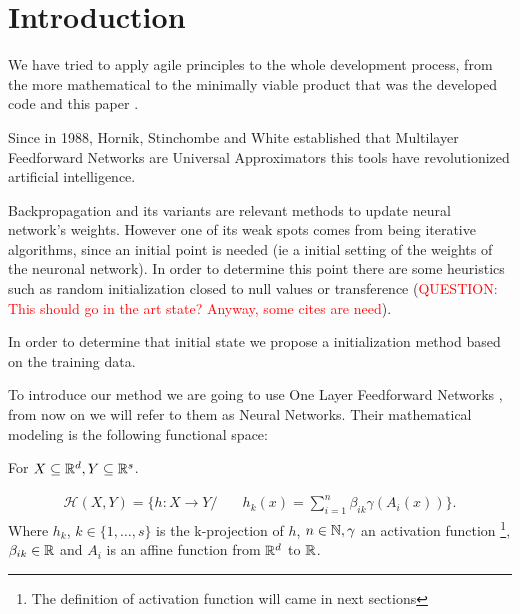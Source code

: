 \section*{Introduction} %

We have tried to apply agile principles to the whole development process, from
the more mathematical to the minimally viable product that was the developed
code and this paper \cite{DBLP:journals/corr/abs-2104-12545}.

Since in 1988, Hornik, Stinchombe and White established
that Multilayer Feedforward Networks are Universal Approximators \cite{HORNIK1989359} this tools have revolutionized artificial intelligence. 

Backpropagation \cite{backpropagation-Hinton} and its 
variants are relevant methods to update neural 
network's weights. However one of its weak spots comes from being iterative 
algorithms, since an initial point is needed (ie a initial setting of the weights of the neuronal network). In order to determine this point 
there are some heuristics such as random initialization
closed to null values or transference (\textcolor{red}{QUESTION: This should go in the art state? Anyway, some cites are need}). 

In order to determine that initial state we propose a initialization method based on the training data. 

To introduce our method we are going to use One Layer
Feedforward Networks \cite{HORNIK1989359} , from now on we will refer to them as Neural Networks. Their mathematical modeling is the following functional space: 

    For $X \subseteq \mathbb{R}^d, Y \subseteq \mathbb{R}^s$. 

    \begin{align} \label{nn_functional_space}
        \mathcal{H}(X,Y) 
        =
        \{
            h : X \longrightarrow Y 
            /& \quad 
            h_k(x) = 
            \sum_{i=1}^{n} \beta_{i k} \gamma( A_{i}(x))          
        \}.
    \end{align}
    Where $h_k$, $k \in \{1, \ldots, s\}$ is the k-projection of $h$, 
    $n \in \mathbb{N},\gamma$ an activation function 
    \footnote{The definition of activation function will came in next sections }, $\beta_{i k} \in \mathbb{R}$ and $A_{i}$ is an affine function from $\mathbb{R}^d$ to $\mathbb{R}$. 

